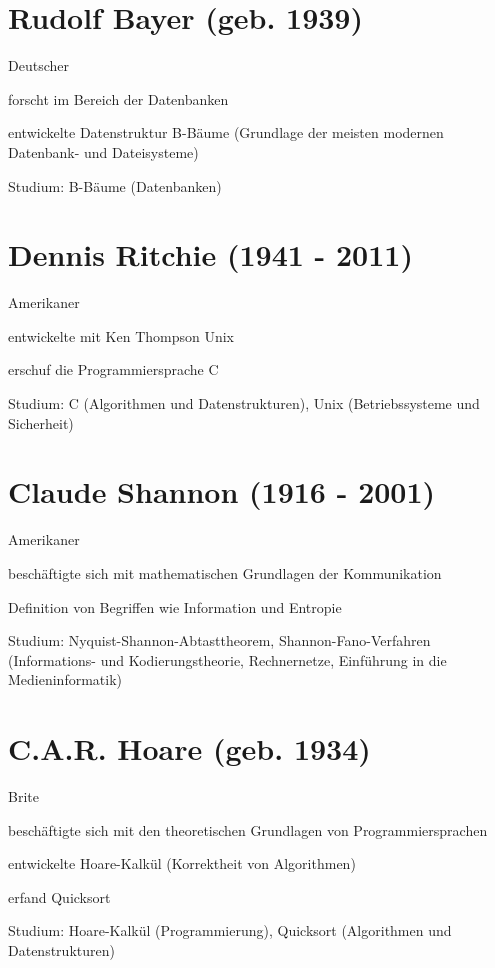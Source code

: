\documentclass[a4paper,12pt]{report}
\begin{document}
\section*{Rudolf Bayer (geb. 1939)}
\begin{itemize*}
	\item Deutscher
	\item forscht im Bereich der Datenbanken
	\item entwickelte Datenstruktur B-Bäume (Grundlage der meisten modernen Datenbank- und
		  Dateisysteme)
	\item Studium: B-Bäume (Datenbanken)
\end{itemize*}

\section*{Dennis Ritchie (1941 - 2011)}
\begin{itemize*}
	\item Amerikaner
	\item entwickelte mit Ken Thompson Unix
	\item erschuf die Programmiersprache C
	\item Studium: C (Algorithmen und Datenstrukturen), Unix (Betriebssysteme und Sicherheit)
\end{itemize*}

\section*{Claude Shannon (1916 - 2001)}
\begin{itemize*}
	\item Amerikaner
	\item beschäftigte sich mit mathematischen Grundlagen der Kommunikation
	\item Definition von Begriffen wie Information und Entropie
	\item Studium: Nyquist-Shannon-Abtasttheorem, Shannon-Fano-Verfahren (Informations- und
	      Kodierungstheorie, Rechnernetze, Einführung in die Medieninformatik)
\end{itemize*}

\section*{C.A.R. Hoare (geb. 1934)}
\begin{itemize*}
	\item Brite
	\item beschäftigte sich mit den theoretischen Grundlagen von Programmiersprachen
	\item entwickelte Hoare-Kalkül (Korrektheit von Algorithmen)
	\item erfand Quicksort
	\item Studium: Hoare-Kalkül (Programmierung), Quicksort (Algorithmen und Datenstrukturen)
\end{itemize*}
\end{document}
